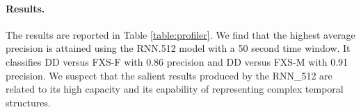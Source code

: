 \documentclass{llncs}
\begin{document}
\paragraph{Results.} The results are reported in Table  \ref{table:profiler}. We find that the highest average precision is attained using the RNN.512 model with a 50 second time window. It classifies DD versus FXS-F with 0.86 precision and DD versus FXS-M with 0.91 precision. We suspect that the salient results produced by the RNN\_512 are related to its high capacity and its capability of representing complex temporal structures.

\begin{table}[t]
    \centering
    \resizebox{0.9\columnwidth}{!}{%
     \begin{tabular}{c|c|c|c}
      & window length & DD vs FXS-female (precision) & DD vs FXS-male (precision)\\
      \hline
      SVM  & 3   & 0.65 & 0.83\\
      & 10 & 0.65 & 0.80 \\
      & 50 & 0.55 & 0.85 \\
      
      \hline
      N.B   & 3  & 0.60 & 0.85\\
      & 10 & 0.60 & 0.87\\
      & 50 & 0.60 & 0.75\\

      \hline
      HMM & 3  & 0.67 & 0.81\\
      & 10 & 0.66 & 0.82\\
      & 50 & 0.68 & 0.74\\

      \hline
      CNN & 3 & 0.68 & 0.82 \\
      & 10 & 0.68 & 0.90\\
      & 50 & 0.55 & 0.77\\

      \hline
      RNN\_128  & 3 &  0.69 & 0.79 \\
      RNN\_250 & 10 &   0.79 &  0.81\\
      RNN\_512 &  50 & {\bf 0.86} & {\bf 0.91}
      \\
    \end{tabular}
    }
    \caption{Comparison of precision of our system against other classifiers. Columns denote pairwise classification precision of participants for DD vs FXS-female and DD vs FXS-male binary classification. Classifiers are run on 3,10, and 50 seconds time windows. We compare the system classifier, RNN to CNN, SVM, NB, and HMM algorithms.}
    \label{table:profiler}
    \vspace*{-2.5em}
  \end{table}
  
\end{document}
